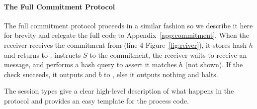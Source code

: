 \paragraph{The Full Commitment Protocol}
The full commitment protocol proceeds in a similar fashion so we describe it here for brevity and relegate the full code to Appendix~\ref{app:commitment}.
When the receiver receives the commitment from \Fro (line 4 Figure~\ref{fig:reiver}), it stores hash $h$ and returns  to \Z.
\Z instructs $S$ to  the commitment, the receiver waits to receive an  message, and performs a hash query to assert it matches $h$ (not shown).
If the check succeeds, it outputs  and $b$ to \Z, else it outputs nothing and halts.

The session types give a clear high-level description of what happens in the protocol and provides an easy template for the process code.



